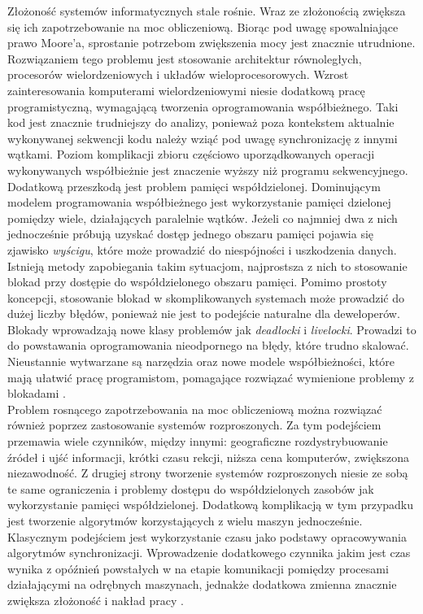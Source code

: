 \documentclass[12pt,twoside]{article}
\begin{document}
Złożoność systemów informatycznych stale rośnie. Wraz ze złożonością
zwiększa się ich zapotrzebowanie na moc obliczeniową. Biorąc pod uwagę
spowalniające prawo Moore'a, sprostanie potrzebom zwiększenia mocy jest
znacznie utrudnione. Rozwiązaniem tego problemu jest stosowanie
architektur równoległych, procesorów wielordzeniowych i układów
wieloprocesorowych. Wzrost zainteresowania komputerami wielordzeniowymi
niesie dodatkową pracę programistyczną, wymagającą tworzenia
oprogramowania współbieżnego. Taki kod jest znacznie trudniejszy do
analizy, ponieważ poza kontekstem aktualnie wykonywanej sekwencji kodu
należy wziąć pod uwagę synchronizację z innymi wątkami. Poziom
komplikacji zbioru częściowo uporządkowanych operacji wykonywanych
współbieżnie jest znaczenie wyższy niż programu sekwencyjnego. Dodatkową
przeszkodą jest problem pamięci współdzielonej. Dominującym modelem
programowania współbieżnego jest wykorzystanie pamięci dzielonej
pomiędzy wiele, działających paralelnie wątków. Jeżeli co najmniej dwa z
nich jednocześnie próbują uzyskać dostęp jednego obszaru pamięci pojawia
się zjawisko \emph{wyścigu}, które może prowadzić do niespójności i
uszkodzenia danych. Istnieją metody zapobiegania takim sytuacjom,
najprostsza z nich to stosowanie blokad przy dostępie do współdzielonego
obszaru pamięci. Pomimo prostoty koncepcji, stosowanie blokad w
skomplikowanych systemach może prowadzić do dużej liczby błędów,
ponieważ nie jest to podejście naturalne dla deweloperów. Blokady
wprowadzają nowe klasy problemów jak \emph{deadlocki} i
\emph{livelocki}. Prowadzi to do powstawania oprogramowania nieodpornego
na błędy, które trudno skalować. Nieustannie wytwarzane są narzędzia
oraz nowe modele współbieżności, które mają ułatwić pracę programistom,
pomagające rozwiązać wymienione problemy z blokadami
\autocite{stutter2005software, lee2006problem}.\\
Problem rosnącego zapotrzebowania na moc obliczeniową można rozwiązać
również poprzez zastosowanie systemów rozproszonych. Za tym podejściem
przemawia wiele czynników, między innymi: geograficzne rozdystrybuowanie
źródeł i ujść informacji, krótki czasu rekcji, niższa cena komputerów,
zwiększona niezawodność. Z drugiej strony tworzenie systemów
rozproszonych niesie ze sobą te same ograniczenia i problemy dostępu do
współdzielonych zasobów jak wykorzystanie pamięci współdzielonej.
Dodatkową komplikacją w tym przypadku jest tworzenie algorytmów
korzystających z wielu maszyn jednocześnie. Klasycznym podejściem jest
wykorzystanie czasu jako podstawy opracowywania algorytmów
synchronizacji. Wprowadzenie dodatkowego czynnika jakim jest czas wynika
z opóźnień powstałych w na etapie komunikacji pomiędzy procesami
działającymi na odrębnych maszynach, jednakże dodatkowa zmienna znacznie
zwiększa złożoność i nakład pracy \autocite{lamport1978time}.
\end{document}
